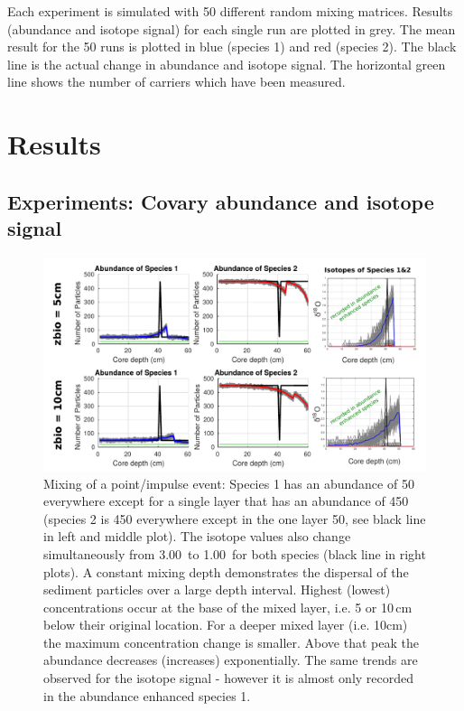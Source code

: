 \documentclass[a4paper,oneside,9pt]{article}
\begin{document}
Each experiment is simulated with 50 different random mixing matrices. Results (abundance and isotope signal) for each single run are plotted in grey. The mean result for the 50 runs is plotted in blue (species 1) and red (species 2).
The black line is the actual change in abundance and isotope signal. The horizontal green line shows the number of carriers which have been measured.

\section{Results}\label{Results} %
\subsection{Experiments: Covary abundance and isotope signal}

\begin{figure}[hbp]
\begin{center}
	\includegraphics[width=1.0\textwidth]{../figures/1point_event_5+10cm_background.pdf}
	\caption{Mixing of a point/impulse event: Species 1 has an abundance of 50 everywhere except for a single layer that has an abundance of 450 (species 2 is 450 everywhere except in the one layer 50, see black line in left and middle plot). 
	The isotope values also change simultaneously from 3.00\textperthousand\ to 1.00\textperthousand\ for both species (black line in right plots). A constant mixing depth demonstrates the dispersal of the sediment particles over a large depth 
	interval. Highest (lowest) concentrations occur at the base of the mixed layer, i.e. 5 or 10\,cm below their original location. For a deeper mixed layer (i.e. 10cm) the maximum concentration change is smaller. 
	Above that peak the abundance decreases (increases) exponentially. The same trends are observed for the isotope signal - however it is almost only recorded in the abundance enhanced species 1. 
	}\label{fig:1pointevent}
\end{center}
\end{figure}
\end{document}
